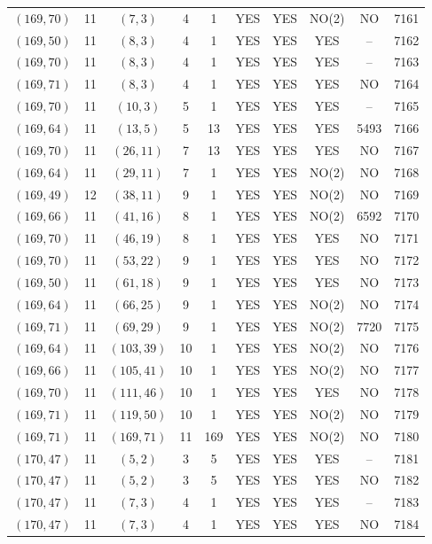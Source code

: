 \begin{longtable}{|c|c|c|c|c|c|c|c|c|c|}
$(169, 70)$ & 11 & $(7, 3)$ & 4 & 1 & YES & YES & NO(2) & NO & 7161\\
$(169, 50)$ & 11 & $(8, 3)$ & 4 & 1 & YES & YES & YES & -- & 7162\\
$(169, 70)$ & 11 & $(8, 3)$ & 4 & 1 & YES & YES & YES & -- & 7163\\
$(169, 71)$ & 11 & $(8, 3)$ & 4 & 1 & YES & YES & YES & NO & 7164\\
$(169, 70)$ & 11 & $(10, 3)$ & 5 & 1 & YES & YES & YES & -- & 7165\\
$(169, 64)$ & 11 & $(13, 5)$ & 5 & 13 & YES & YES & YES & 5493 & 7166\\
$(169, 70)$ & 11 & $(26, 11)$ & 7 & 13 & YES & YES & YES & NO & 7167\\
$(169, 64)$ & 11 & $(29, 11)$ & 7 & 1 & YES & YES & NO(2) & NO & 7168\\
$(169, 49)$ & 12 & $(38, 11)$ & 9 & 1 & YES & YES & NO(2) & NO & 7169\\
$(169, 66)$ & 11 & $(41, 16)$ & 8 & 1 & YES & YES & NO(2) & 6592 & 7170\\
$(169, 70)$ & 11 & $(46, 19)$ & 8 & 1 & YES & YES & YES & NO & 7171\\
$(169, 70)$ & 11 & $(53, 22)$ & 9 & 1 & YES & YES & YES & NO & 7172\\
$(169, 50)$ & 11 & $(61, 18)$ & 9 & 1 & YES & YES & YES & NO & 7173\\
$(169, 64)$ & 11 & $(66, 25)$ & 9 & 1 & YES & YES & NO(2) & NO & 7174\\
$(169, 71)$ & 11 & $(69, 29)$ & 9 & 1 & YES & YES & NO(2) & 7720 & 7175\\
$(169, 64)$ & 11 & $(103, 39)$ & 10 & 1 & YES & YES & NO(2) & NO & 7176\\
$(169, 66)$ & 11 & $(105, 41)$ & 10 & 1 & YES & YES & NO(2) & NO & 7177\\
$(169, 70)$ & 11 & $(111, 46)$ & 10 & 1 & YES & YES & YES & NO & 7178\\
$(169, 71)$ & 11 & $(119, 50)$ & 10 & 1 & YES & YES & NO(2) & NO & 7179\\
$(169, 71)$ & 11 & $(169, 71)$ & 11 & 169 & YES & YES & NO(2) & NO & 7180\\
$(170, 47)$ & 11 & $(5, 2)$ & 3 & 5 & YES & YES & YES & -- & 7181\\
$(170, 47)$ & 11 & $(5, 2)$ & 3 & 5 & YES & YES & YES & NO & 7182\\
$(170, 47)$ & 11 & $(7, 3)$ & 4 & 1 & YES & YES & YES & -- & 7183\\
$(170, 47)$ & 11 & $(7, 3)$ & 4 & 1 & YES & YES & YES & NO & 7184\\

\end{longtable}
